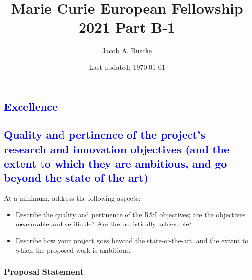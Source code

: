 \documentclass[11pt,a4paper]{article}
\title{Marie Curie European Fellowship 2021 Part B-1}
\author{Jacob A. Busche}
\date{Last updated: \today}
\begin{document}
\maketitle



\noindent{}

\textcolor{Blue}{\section{Excellence}}

\textcolor{Blue}{\subsection{Quality and pertinence of the project's research and innovation objectives (and the extent to which they are ambitious, and go beyond the state of the art)}}

\color{gray}
At a minimum, address the following aspects:
\begin{itemize}
    \item Describe the quality and pertinence of the R\&I objectives; are the objectives measurable and verifiable? Are the realistically achievable?
    \item Describe how your project goes beyond the state-of-the-art, and the extent to which the proposed work is ambitious.
\end{itemize}
\color{black}



\newpage


\subsubsection{Proposal Statement}
\end{document}
